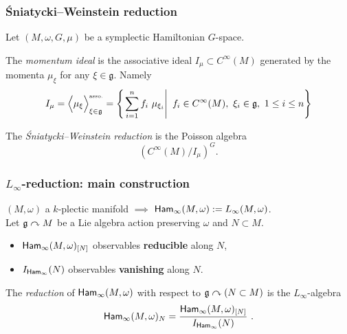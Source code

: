 \documentclass[handout,10pt]{beamer}
\begin{document}
\begin{frame}\frametitle{\'Sniatycki--Weinstein reduction}
	Let $(M,\omega,G,\mu)$ be a symplectic Hamiltonian $G$-space.

	\begin{definition}
		The \emph{momentum ideal} is the associative ideal $I_\mu\subset C^\infty(M)$ generated by the momenta $\mu_{\xi}$ for any $\xi\in \mathfrak{g}$.
		Namely
		\[
			I_\mu 
			= 
			\Big\langle \mu_\xi \Big\rangle_{\xi \in \mathfrak{g}}^{\text{\tiny asso.}} 
			=
			\left\{
				\left.
					\sum_{i=1}^n f_i ~ \mu_{\xi_i}
				\right|~
					f_i \in C^\infty(M),~ \xi_i\in \mathfrak{g},~  1 \leq i \leq n
			\right\}
		\]
	\end{definition}

	\vspace{3pt}
	\begin{definition}
		The \emph{\'Sniatycki--Weinstein reduction} is the Poisson algebra
		\[
			\left(C^\infty(M)/I_\mu\right)^G.
		\]
	\end{definition}
\end{frame}


\begin{frame}\frametitle{$L_\infty$-reduction: main construction}
	$(M,\omega)$ a $k$-plectic manifold $\implies$ $\mathsf{Ham}_\infty(M,\omega) := L_\infty(M,\omega)$.\\[2pt]

	Let $\mathfrak{g}\curvearrowright M$ be a Lie algebra action preserving $\omega$ and $N\subset M$.\\[5pt]

	\begin{itemize}
		\item $\mathsf{Ham}_\infty(M,\omega)_{[N]}$ observables \textbf{reducible} along $N$,
		\item $I_{\mathsf{Ham}_\infty}(N)$ observables \textbf{vanishing} along $N$.
	\end{itemize}

	\begin{theorem}
		The \emph{reduction} of $\mathsf{Ham}_\infty(M,\omega)$ with respect to $\mathfrak{g}\curvearrowright (N\subset M)$ is the $L_\infty$-algebra
		\[
		\mathsf{Ham}_\infty(M,\omega)_N = \frac{\mathsf{Ham}_\infty(M,\omega)_{[N]}}{I_{\mathsf{Ham}_\infty}(N)}~.
		\]
	\end{theorem}
\end{frame}
\end{document}
